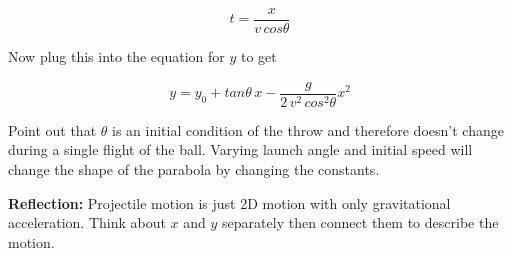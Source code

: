 \documentclass{article}
\begin{document}
\begin{enumerate}
\begin{equation}
	t = \frac{x}{v \, cos \theta}
\end{equation}

Now plug this into the equation for $y$ to get

\begin{equation}
	y = y_0 + tan \theta \, x - \frac{g}{2 \, v^2 \, cos^2 \theta} x^2
\end{equation}

Point out that $\theta$ is an initial condition of the throw and therefore doesn't change during a single flight of the ball. Varying launch angle and initial speed will change the shape of the parabola by changing the constants.

\end{enumerate}

\textbf{Reflection:} Projectile motion is just 2D motion with only gravitational acceleration. Think about $x$ and $y$ separately then connect them to describe the motion.

\hspace{14pt}
\end{document}
